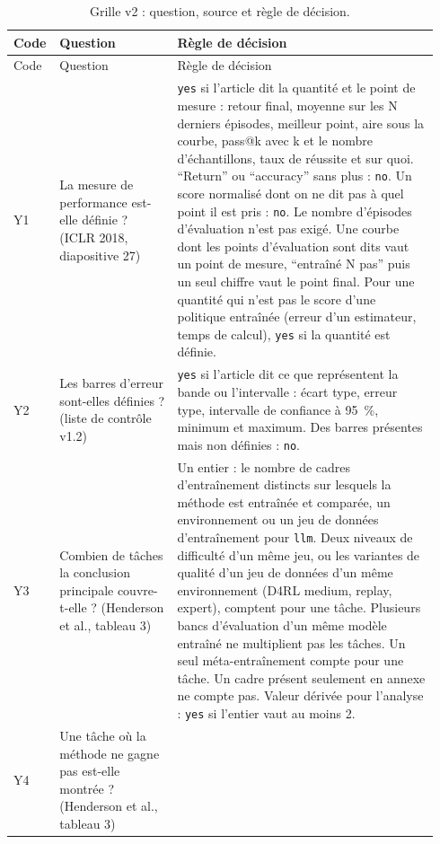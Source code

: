 \begin{small}
\begin{longtable}{@{}p{0.07\linewidth}>{\raggedright\arraybackslash}p{0.27\linewidth}>{\raggedright\arraybackslash}p{0.6\linewidth}@{}}
\caption{Grille v2 : question, source et règle de décision.}\label{tab:a-grille-y}\\
\toprule
Code & Question & Règle de décision \\
\midrule
\endfirsthead
\toprule
Code & Question & Règle de décision \\
\midrule
\endhead
\bottomrule
\endfoot
Y1 & La mesure de performance est-elle définie ? (ICLR 2018, diapositive 27) & \texttt{yes} si
  l'article dit la quantité et le point de mesure : retour final, moyenne sur les N derniers
  épisodes, meilleur point, aire sous la courbe, pass@k avec k et le nombre d'échantillons, taux de
  réussite et sur quoi. \enquote{Return} ou \enquote{accuracy} sans plus : \texttt{no}. Un score
  normalisé dont on ne dit pas à quel point il est pris : \texttt{no}. Le nombre d'épisodes
  d'évaluation n'est pas exigé. Une courbe dont les points d'évaluation sont dits vaut un
  point de mesure, \enquote{entraîné N pas} puis un seul chiffre vaut le point final. Pour une
  quantité qui n'est pas le score d'une politique entraînée (erreur d'un estimateur, temps de
  calcul), \texttt{yes} si la quantité est définie. \\
Y2 & Les barres d'erreur sont-elles définies ? (liste de contrôle v1.2) & \texttt{yes} si l'article
  dit ce que représentent la bande ou l'intervalle : écart type, erreur type, intervalle de confiance
  à 95~\%, minimum et maximum. Des barres présentes mais non définies : \texttt{no}. \\
Y3 & Combien de tâches la conclusion principale couvre-t-elle ? (Henderson et al., tableau 3) & Un
  entier : le nombre de cadres d'entraînement distincts sur lesquels la méthode est entraînée et
  comparée, un environnement ou un jeu de données d'entraînement pour \texttt{llm}. Deux niveaux de
  difficulté d'un même jeu, ou les variantes de qualité d'un jeu de données d'un même environnement
  (D4RL medium, replay, expert), comptent pour une tâche. Plusieurs bancs d'évaluation d'un même
  modèle entraîné ne multiplient pas les tâches. Un seul méta-entraînement compte pour une
  tâche. Un cadre présent seulement en annexe ne compte pas. Valeur dérivée pour
  l'analyse : \texttt{yes} si l'entier vaut au moins 2. \\
Y4 & Une tâche où la méthode ne gagne pas est-elle montrée ? (Henderson et al., tableau 3) &

\end{longtable}
\end{small}

